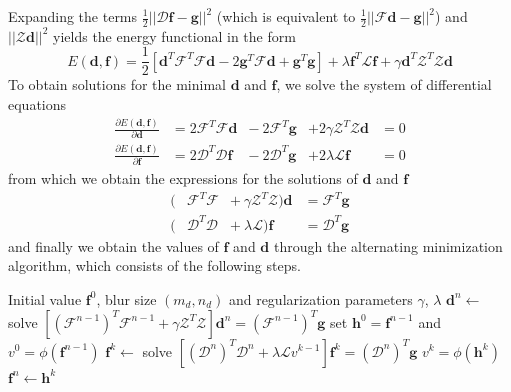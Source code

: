 \documentclass[12pt,notitlepage]{report}
\begin{document}
Expanding the terms $\frac{1}{2}||\mathcal{D}\mathbf{f} - \mathbf{g}||^2$ (which is equivalent to $\frac{1}{2}||\mathcal{F}\mathbf{d} - \mathbf{g}||^2$) and $||\mathcal{Z} \mathbf{d}||^2$ yields the energy functional in the form
\begin{equation}
\label{eq:srou03_energy_vec_exp}
	E(\mathbf{d},\mathbf{f}) = \frac{1}{2}[\mathbf{d}^T \mathcal{F}^T \mathcal{F} \mathbf{d}  - 2 \mathbf{g}^T \mathcal{F} \mathbf{d} + \mathbf{g}^T \mathbf{g}] + \lambda \mathbf{f}^T \mathcal{L} \mathbf{f} + \gamma \mathbf{d}^T \mathcal{Z}^T \mathcal{Z} \mathbf{d}	
\end{equation}
To obtain solutions for the minimal $\mathbf{d}$ and $\mathbf{f}$, we solve the system of differential equations
\begin{equation}
\label{eq:srou03_energy_vec_partial}
	\begin{aligned}
		\frac{\partial E(\mathbf{d},\mathbf{f})}{\partial \mathbf{d}} &= 2 \mathcal{F}^T \mathcal{F} \mathbf{d} &- \ 2 \mathcal{F}^T \mathbf{g} &+ 2 \gamma \mathcal{Z}^T \mathcal{Z} \mathbf{d} &= 0 \\	
		\frac{\partial E(\mathbf{d},\mathbf{f})}{\partial \mathbf{f}} &= 2 \mathcal{D}^T \mathcal{D} \mathbf{f} &- \ 2 \mathcal{D}^T \mathbf{g} &+ 2 \lambda              \mathcal{L} \mathbf{f} &= 0
	\end{aligned}
\end{equation}
from which we obtain the expressions for the solutions of $\mathbf{d}$ and $\mathbf{f}$
\begin{equation}
\label{eq:srou03_solutions}
	\begin{aligned}
		( &\mathcal{F}^T \mathcal{F} &+ \ \gamma \mathcal{Z}^T \mathcal{Z} ) \mathbf{d} &= \mathcal{F}^T \mathbf{g} \\
		( &\mathcal{D}^T \mathcal{D} &+ \ \lambda              \mathcal{L} ) \mathbf{f} &= \mathcal{D}^T \mathbf{g}	
	\end{aligned}
\end{equation}
and finally we obtain the values of $\mathbf{f}$ and $\mathbf{d}$ through the alternating minimization algorithm, which consists of the following steps.
\begin{algorithmic}
	\REQUIRE Initial value $\mathbf{f}^0$, blur size $(m_d, n_d)$ and regularization parameters $\gamma$, $\lambda$
		\STATE $\mathbf{d}^n \gets$ solve $[(\mathcal{F}^{n - 1})^T \mathcal{F}^{n - 1} + \gamma \mathcal{Z}^T \mathcal{Z} ] \mathbf{d}^n = (\mathcal{F}^{n - 1})^T \mathbf{g}$ 
		\STATE set $\mathbf{h}^0 = \mathbf{f}^{n - 1}$ and $v^0 = \phi(\mathbf{f}^{n - 1})$ 
			\STATE $\mathbf{f}^k \gets$ solve $[(\mathcal{D}^n)^T \mathcal{D}^n + \lambda \mathcal{L} v^{k-1} ] \mathbf{f}^k = (\mathcal{D}^n)^T \mathbf{g}$
			\STATE $v^k = \phi(\mathbf{h}^k)$
		\ENDFOR
		\STATE $\mathbf{f}^n \gets \mathbf{h}^k$
	\ENDFOR
\end{algorithmic}
\end{document}
